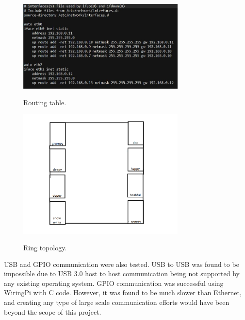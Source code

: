  \begin{figure}[tbh]
	\caption{Routing table.}
	\centering
		\includegraphics[width=0.75\textwidth]{routingtable.JPG}
	\label{fig:routing}
\end{figure}

 \begin{figure}[tbh]
	\caption{Ring topology.}
	\centering
		\includegraphics[width=0.75\textwidth]{ring.png}
	\label{fig:ring}
\end{figure}

	USB and GPIO communication were also tested. USB to USB was found to be impossible due to USB 3.0 host to host communication being not supported by any existing operating system. GPIO communication was successful using WiringPi with C code. However, it was found to be much slower than Ethernet, and creating any type of large scale communication efforts would have been beyond the scope of this project.
 
 

